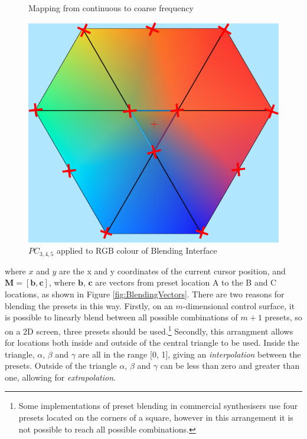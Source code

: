 \documentclass[11pt, oneside]{report}   	%
\renewcommand{\vec}[1]{\mathbf{#1}}
\begin{document}
\begin{figure}
	\caption{Mapping from continuous to coarse frequency}
	\label{fig:Freq Coarse}
	\includegraphics[width = \textwidth/3]{BlendingColours2.png}
	\caption{$PC_{3,4,5}$ applied to RGB colour of Blending Interface}
	\label{fig:BlendingColours}
	\vspace{-30pt}
\end{figure}
where $x$ and $y$ are the x and y coordinates of the current cursor position, and $\vec{M} =[\vec{b},  \vec{c}]$, where $\vec{b}$,  $\vec{c}$ are vectors from preset location A to the B and C locations, as shown in Figure \ref{fig:BlendingVectors}. There are two reasons for blending the presets in this way. Firstly, on an $m$-dimensional control surface, it is possible to linearly blend between all possible combinations of $m+1$ presets, so on a 2D screen, three presets should be used.\footnote{Some implementations of preset blending in commercial synthesisers use four presets located on the corners of a square, however in this arrangement it is not possible to reach all possible combinations.} Secondly, this arrangment allows for locations both inside and outside of the central triangle to be used. Inside the triangle, $\alpha$, $\beta$ and $\gamma$ are all in the range [0, 1], giving an \emph{interpolation} between the presets. Outside of the triangle $\alpha$, $\beta$ and $\gamma$ can be less than zero and greater than one, allowing for \emph{extrapolation}.
\end{document}
